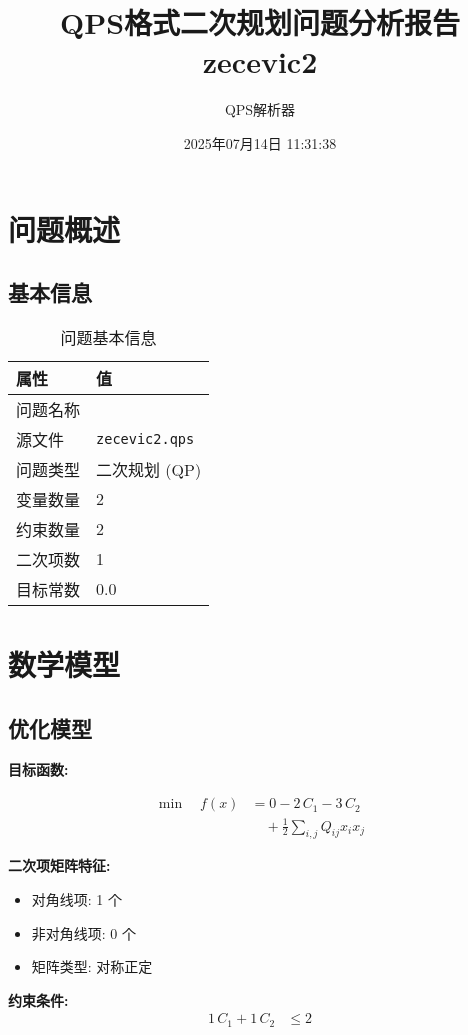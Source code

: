\documentclass[a4paper,11pt]{article}
\title{QPS格式二次规划问题分析报告\\{\large zecevic2}}
\author{QPS解析器}
\date{2025年07月14日 11:31:38}
\begin{document}
\maketitle
\tableofcontents
\newpage

\section{问题概述}
\subsection{基本信息}
\begin{table}[h!]
\centering
\begin{tabular}{ll}
\toprule
\textbf{属性} & \textbf{值} \\
\midrule
问题名称 & \texttt{} \\
源文件 & \texttt{zecevic2.qps} \\
问题类型 & 二次规划 (QP) \\
变量数量 & 2 \\
约束数量 & 2 \\
二次项数 & 1 \\
目标常数 & 0.0 \\
\bottomrule
\end{tabular}
\caption{问题基本信息}
\end{table}

\section{数学模型}
\subsection{优化模型}

\textbf{目标函数:}

\begin{align}
\min\quad f(x) &= 0 - 2\,C_{1} - 3\,C_{2} \nonumber\\
&\quad + \frac{1}{2} \sum_{i,j} Q_{ij} x_i x_j\label{eq:objective}
\end{align}

\textbf{二次项矩阵特征:}
\begin{itemize}
\item 对角线项: 1 个
\item 非对角线项: 0 个
\item 矩阵类型: 对称正定
\end{itemize}

\textbf{约束条件:}
\begin{align}
1\,C_{1} + 1\,C_{2} &\leq 2 \nonumber
\end{align}
\end{document}

